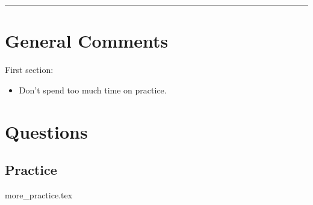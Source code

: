 \documentclass{exam}
\title{}
\date{}
\begin{document}
\maketitle
\rule{\textwidth}{0.15em}
\fontsize{12}{15}\selectfont
\thispagestyle{empty}


\section{General Comments}
\begin{questions}
\item First section:
\begin{itemize}
\item Don't spend too much time on practice.
\end{itemize}
\end{questions}

\section{Questions}
\subsection{Practice}
\begin{enumerate}
{more_practice.tex}
\end{enumerate}



\end{document}

